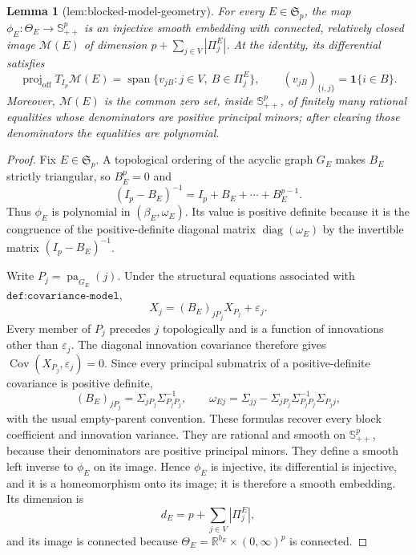 \documentclass{article}
\newtheorem{lemma}{Lemma}
\begin{document}
\begin{lemma}[lem:blocked-model-geometry]\label{lem:blocked-model-geometry}
For every \(E\in\mathfrak S_p\), the map \(\phi_E:\Theta_E\to\mathbb S^p_{++}\) is an injective smooth embedding with connected, relatively closed image \(\mathcal M(E)\) of dimension \(p+\sum_{j\in V}|\Pi^E_j|\). At the identity, its differential satisfies
\[
 \operatorname{proj}_{\mathrm{off}}T_{I_p}\mathcal M(E)
 =\operatorname{span}\{v_{jB}:j\in V,\ B\in\Pi^E_j\},
 \qquad (v_{jB})_{\{i,j\}}=\mathbf 1\{i\in B\}.
\]
Moreover, \(\mathcal M(E)\) is the common zero set, inside \(\mathbb S^p_{++}\), of finitely many rational equalities whose denominators are positive principal minors; after clearing those denominators the equalities are polynomial.
\end{lemma}
\begin{proof}
Fix \(E\in\mathfrak S_p\). A topological ordering of the acyclic graph \(G_E\) makes \(B_E\) strictly triangular, so \(B_E^p=0\) and
\[
 (I_p-B_E)^{-1}=I_p+B_E+\cdots+B_E^{p-1}.
\]
Thus \(\phi_E\) is polynomial in \((\beta_E,\omega_E)\). Its value is positive definite because it is the congruence of the positive-definite diagonal matrix \(\operatorname{diag}(\omega_E)\) by the invertible matrix \((I_p-B_E)^{-1}\).

Write \(P_j=\operatorname{pa}_{G_E}(j)\). Under the structural equations associated with \(\texttt{def:covariance-model}\),
\[
 X_j=(B_E)_{jP_j}X_{P_j}+\varepsilon_j.
\]
Every member of \(P_j\) precedes \(j\) topologically and is a function of innovations other than \(\varepsilon_j\). The diagonal innovation covariance therefore gives \(\operatorname{Cov}(X_{P_j},\varepsilon_j)=0\). Since every principal submatrix of a positive-definite covariance is positive definite,
\[
 (B_E)_{jP_j}=\Sigma_{jP_j}\Sigma_{P_jP_j}^{-1},
 \qquad
 \omega_{Ej}=\Sigma_{jj}-\Sigma_{jP_j}\Sigma_{P_jP_j}^{-1}\Sigma_{P_jj},
\]
with the usual empty-parent convention. These formulas recover every block coefficient and innovation variance. They are rational and smooth on \(\mathbb S^p_{++}\), because their denominators are positive principal minors. They define a smooth left inverse to \(\phi_E\) on its image. Hence \(\phi_E\) is injective, its differential is injective, and it is a homeomorphism onto its image; it is therefore a smooth embedding. Its dimension is
\[
 d_E=p+\sum_{j\in V}|\Pi^E_j|,
\]
and its image is connected because \(\Theta_E=\mathbb R^{b_E}\times(0,\infty)^p\) is connected.


\end{proof}
\end{document}
